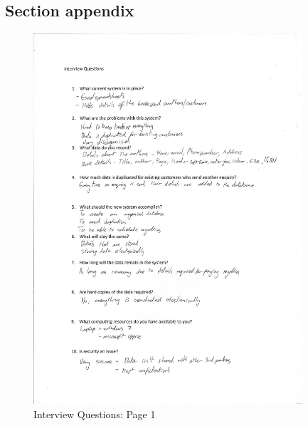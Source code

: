 \subsection{Section appendix}

\begin{figure}[H]
    \includegraphics[width= 10cm]{./Analysis/Interview_Questions_1.jpg}
    \caption{Interview Questions: Page 1} \label{Interview_Questions_1.jpg}
\end{figure}


